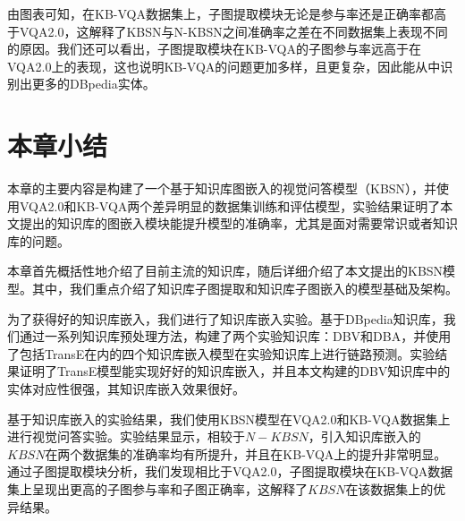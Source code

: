 由图表可知，在KB-VQA数据集上，子图提取模块无论是参与率还是正确率都高于VQA2.0，这解释了KBSN与N-KBSN之间准确率之差在不同数据集上表现不同的原因。我们还可以看出，子图提取模块在KB-VQA的子图参与率远高于在VQA2.0上的表现，这也说明KB-VQA的问题更加多样，且更复杂，因此能从中识别出更多的DBpedia实体。

\section{本章小结}
本章的主要内容是构建了一个基于知识库图嵌入的视觉问答模型（KBSN），并使用VQA2.0和KB-VQA两个差异明显的数据集训练和评估模型，实验结果证明了本文提出的知识库的图嵌入模块能提升模型的准确率，尤其是面对需要常识或者知识库的问题。

本章首先概括性地介绍了目前主流的知识库，随后详细介绍了本文提出的KBSN模型。其中，我们重点介绍了知识库子图提取和知识库子图嵌入的模型基础及架构。

为了获得好的知识库嵌入，我们进行了知识库嵌入实验。基于DBpedia知识库，我们通过一系列知识库预处理方法，构建了两个实验知识库：DBV和DBA，并使用了包括TransE在内的四个知识库嵌入模型在实验知识库上进行链路预测。实验结果证明了TransE模型能实现好好的知识库嵌入，并且本文构建的DBV知识库中的实体对应性很强，其知识库嵌入效果很好。

基于知识库嵌入的实验结果，我们使用KBSN模型在VQA2.0和KB-VQA数据集上进行视觉问答实验。实验结果显示，相较于$N-KBSN$，引入知识库嵌入的$KBSN$在两个数据集的准确率均有所提升，并且在KB-VQA上的提升非常明显。通过子图提取模块分析，我们发现相比于VQA2.0，子图提取模块在KB-VQA数据集上呈现出更高的子图参与率和子图正确率，这解释了$KBSN$在该数据集上的优异结果。






















